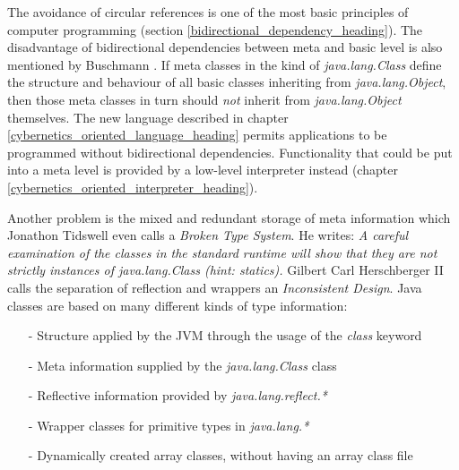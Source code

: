 The avoidance of circular references is one of the most basic principles of
computer programming (section \ref{bidirectional_dependency_heading}). The
disadvantage of bidirectional dependencies between meta and basic level is also
mentioned by Buschmann \cite{buschmann}. If meta classes in the kind of
\emph{java.lang.Class} define the structure and behaviour of all basic classes
inheriting from \emph{java.lang.Object}, then those meta classes in turn should
\emph{not} inherit from \emph{java.lang.Object} themselves. The new language
described in chapter \ref{cybernetics_oriented_language_heading} permits
applications to be programmed without bidirectional dependencies. Functionality
that could be put into a meta level is provided by a low-level interpreter
instead (chapter \ref{cybernetics_oriented_interpreter_heading}).

Another problem is the mixed and redundant storage of meta information which
Jonathon Tidswell \cite{josgeneral} even calls a \emph{Broken Type System}. He
writes: \textit{A careful examination of the classes in the standard runtime will
show that they are not strictly instances of java.lang.Class (hint: statics).}
Gilbert Carl Herschberger II \cite{josgeneral} calls the separation of
reflection and wrappers an \emph{Inconsistent Design}. Java classes are based
on many different kinds of type information:

\begin{itemize}
    \item[-] Structure applied by the JVM through the usage of the \emph{class} keyword
    \item[-] Meta information supplied by the \emph{java.lang.Class} class
    \item[-] Reflective information provided by \emph{java.lang.reflect.*}
    \item[-] Wrapper classes for primitive types in \emph{java.lang.*}
    \item[-] Dynamically created array classes, without having an array class file
\end{itemize}

